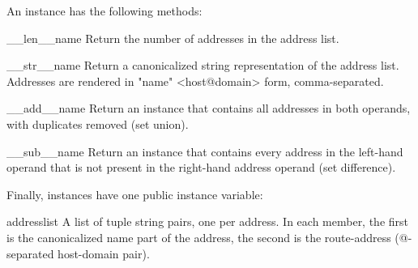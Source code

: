 An  instance has the following methods:

\begin{methoddesc}{__len__}{name}
Return the number of addresses in the address list.
\end{methoddesc}

\begin{methoddesc}{__str__}{name}
Return a canonicalized string representation of the address list.
Addresses are rendered in "name" <host@domain> form, comma-separated.
\end{methoddesc}

\begin{methoddesc}{__add__}{name}
Return an  instance that contains all addresses in
both  operands, with duplicates removed (set union).
\end{methoddesc}

\begin{methoddesc}{__sub__}{name}
Return an  instance that contains every address in the
left-hand  operand that is not present in the right-hand
address operand (set difference).
\end{methoddesc}


Finally,  instances have one public instance variable:

\begin{memberdesc}{addresslist}
A list of tuple string pairs, one per address.  In each member, the
first is the canonicalized name part of the address, the second is the
route-address (@-separated host-domain pair).
\end{memberdesc}
